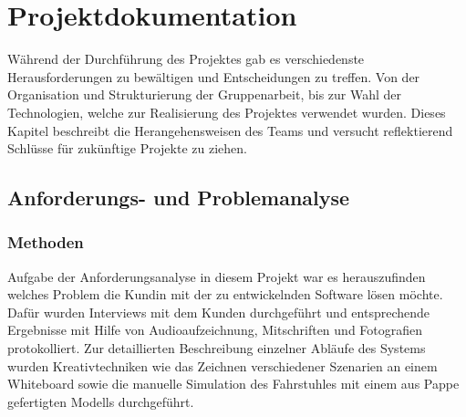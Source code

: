 \part{Projektdokumentation}
Während der Durchführung des Projektes gab es verschiedenste Herausforderungen zu bewältigen und Entscheidungen zu treffen. Von der Organisation und Strukturierung der Gruppenarbeit, bis zur Wahl der Technologien, welche zur Realisierung des Projektes verwendet wurden. Dieses Kapitel beschreibt die Herangehensweisen des Teams und versucht reflektierend Schlüsse für zukünftige Projekte zu ziehen. 
\chapter{Anforderungs- und Problemanalyse}
\section{Methoden}
Aufgabe der Anforderungsanalyse in diesem Projekt war es herauszufinden welches Problem die Kundin mit der zu entwickelnden Software lösen möchte. Dafür wurden Interviews mit dem Kunden durchgeführt und entsprechende Ergebnisse mit Hilfe von Audioaufzeichnung, Mitschriften und Fotografien protokolliert. Zur detaillierten Beschreibung einzelner Abläufe des Systems wurden Kreativtechniken wie das Zeichnen verschiedener Szenarien an einem Whiteboard sowie die manuelle Simulation des Fahrstuhles mit einem aus Pappe gefertigten Modells durchgeführt.
